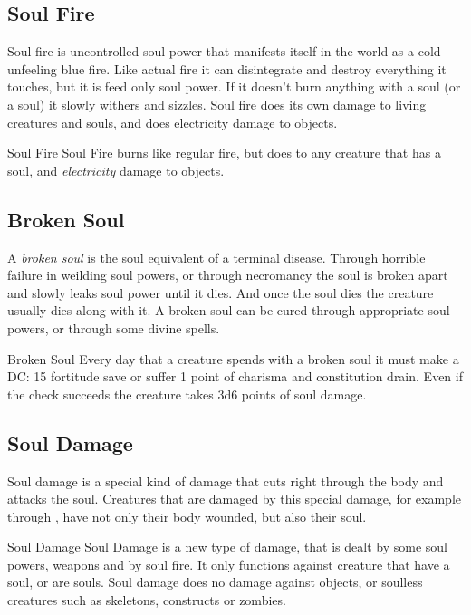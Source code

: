 \subsection{Soul Fire}
\label{sec:Soul Fire}

Soul fire is uncontrolled soul power that manifests itself in the world as a
cold unfeeling blue fire. Like actual fire it can disintegrate and destroy
everything it touches, but it is feed only soul power. If it doesn't burn
anything with a soul (or a soul) it slowly withers and sizzles. Soul fire does
its own damage to living creatures and souls, and does electricity damage to
objects.

\begin{35e}{Soul Fire}
  Soul Fire burns like regular fire, but does  to any
  creature that has a soul, and \emph{electricity} damage to objects.
\end{35e}

\subsection{Broken Soul}
\label{sec:Broken Soul}

A \emph{broken soul} is the soul equivalent of a terminal disease. Through
horrible failure in weilding soul powers, or through necromancy the soul is
broken apart and slowly leaks soul power until it dies. And once the soul dies
the creature usually dies along with it. A broken soul can be cured through
appropriate soul powers, or through some divine spells.

\begin{35e}{Broken Soul}
  Every day that a creature spends with a broken soul it must make a DC: 15
  fortitude save or suffer 1 point of charisma and constitution drain. Even if
  the check succeeds the creature takes 3d6 points of soul damage.
\end{35e}

\subsection{Soul Damage}
\label{sec:Soul Damage}

Soul damage is a special kind of damage that cuts right through the body and
attacks the soul. Creatures that are damaged by this special damage, for
example through , have not only their body wounded,
but also their soul.

\begin{35e}{Soul Damage}
  Soul Damage is a new type of damage, that is dealt by some soul powers,
  weapons and by soul fire. It only functions against creature that have a
  soul, or are souls. Soul damage does no damage against objects, or soulless
  creatures such as skeletons, constructs or zombies.
\end{35e}

